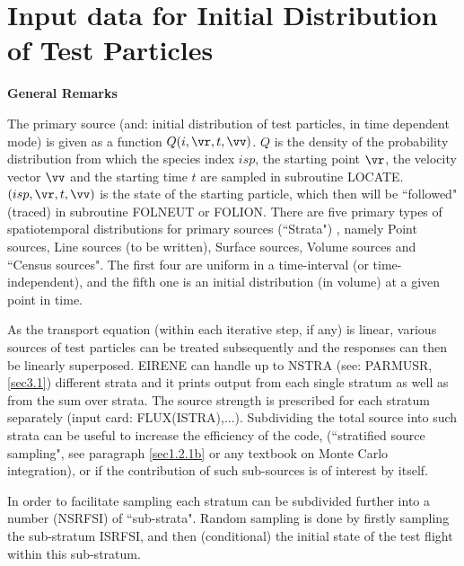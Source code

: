 \newpage
\section{Input data for Initial Distribution of Test Particles}
\label{sec2.7}

\medskip

\noindent %

{\bf General Remarks}

\medskip

\noindent

The primary source (and: initial distribution of test particles,
in time dependent mode) is given as a function $Q(i, \vr,t
, \vv)$. $ Q $ is the density of the probability
distribution from which the species index $ isp $, the starting
point $\vr $, the velocity vector $\vv $ and
the starting time $ t $ are sampled in subroutine LOCATE. $(isp,
\vr,t , \vv)$ is the state of the starting
particle, which then will be ``followed" (traced) in subroutine FOLNEUT or
FOLION. There are five primary types of spatiotemporal distributions for primary sources (``Strata") , namely
Point sources, Line sources (to be written), Surface sources,
Volume sources and ``Census sources". The first four are uniform in a time-interval (or time-independent),
and the fifth one is an initial distribution (in volume) at a given point in time.

As the transport equation (within each iterative step, if any) is linear, various sources of test
particles can be treated subsequently and the responses can then
be linearly superposed.
EIRENE can handle up to NSTRA (see: PARMUSR, \ref{sec3.1})
different strata and it prints
output from
each single stratum as well as from the sum over strata. The source strength
is prescribed for each stratum separately (input card: FLUX(ISTRA),...).
Subdividing the total source into such strata can be useful
to increase
the efficiency of the code, (``stratified source sampling", see paragraph \ref{sec1.2.1b} or any
textbook on Monte Carlo integration), or if
the contribution of such sub-sources is of interest by itself.

In order to facilitate sampling each stratum can be subdivided
further into a number (NSRFSI) of ``sub-strata". Random sampling is
done by firstly sampling the sub-stratum ISRFSI, and then
(conditional) the initial state of the test flight within this
sub-stratum.

